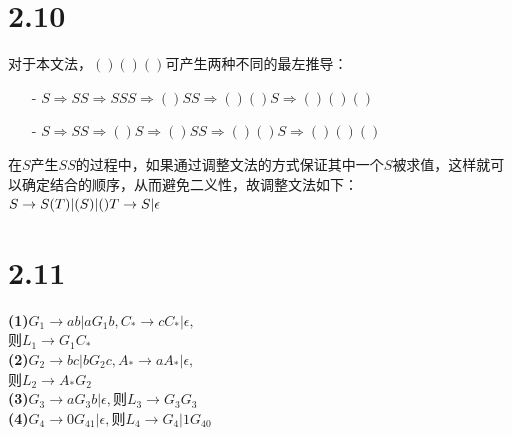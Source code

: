 \documentclass{article}
\begin{document}
\section*{2.10}
\noindent 
对于本文法，$()()()$可产生两种不同的最左推导：
\begin{itemize}
    \item [-] $S\Rightarrow SS\Rightarrow SSS\Rightarrow ()SS\Rightarrow ()()S\Rightarrow ()()()$
    \item [-] $S\Rightarrow SS\Rightarrow ()S\Rightarrow ()SS\Rightarrow ()()S\Rightarrow ()()()$
\end{itemize}
在$S$产生$SS$的过程中，如果通过调整文法的方式保证其中一个$S$被求值，这样就可以确定结合的顺序，从而避免二义性，故调整文法如下：\\
$S\rightarrow S(T)|(S)|()\\
T\rightarrow S|\epsilon$
\section*{2.11}
\noindent 
\textbf{(1)}$G_1\rightarrow ab|aG_1b,C_*\rightarrow cC_*|\epsilon,$\\
则$L_1\rightarrow G_1C_*$\\
\textbf{(2)}$G_2\rightarrow bc|bG_2c,A_*\rightarrow aA_*|\epsilon,$\\
则$L_2\rightarrow A_*G_2$\\
\textbf{(3)}$G_3\rightarrow aG_3b|\epsilon,$则$L_3\rightarrow G_3G_3$\\
\textbf{(4)}$G_4\rightarrow 0G_41|\epsilon,$则$L_4\rightarrow G_4|1G_40$
\end{document}
